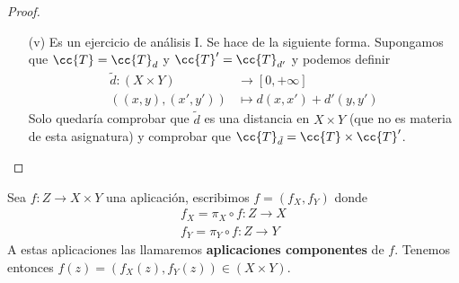 \begin{prop}
\begin{proof}
\begin{itemize}
\begin{itemize}
                \item[(v)] Es un ejercicio de análisis I. Se hace de la siguiente forma. Supongamos que $\cc{T}=\cc{T}_d$ y $\cc{T}'=\cc{T}_{d'}$ y podemos definir
                \begin{align*}
                    \tilde{d} :(X\times Y) &\to [0,+\infty]\\
                    ((x,y),(x',y')) & \mapsto d(x,x') + d'(y,y')
                \end{align*}
                Solo quedaría comprobar que $\tilde{d}$ es una distancia en $X\times Y$ (que no es materia de esta asignatura) y comprobar que $\cc{T}_{\tilde{d}} = \cc{T}\times \cc{T}'$.
            \end{itemize}
        \end{itemize}
    \end{proof}
\end{prop}


\begin{definicion}
    Sea $f:Z \to X \times Y$ una aplicación, escribimos $f=(f_X, f_Y)$ donde
    \begin{align*}
        f_X=\pi_X \circ f: Z \to X\\
        f_Y=\pi_Y \circ f: Z \to Y
    \end{align*}
    A estas aplicaciones las llamaremos \textbf{aplicaciones componentes} de $f$. Tenemos entonces $f(z)=(f_X(z), f_Y(z))\in (X \times Y)$.
    \endsquare
\end{definicion}

